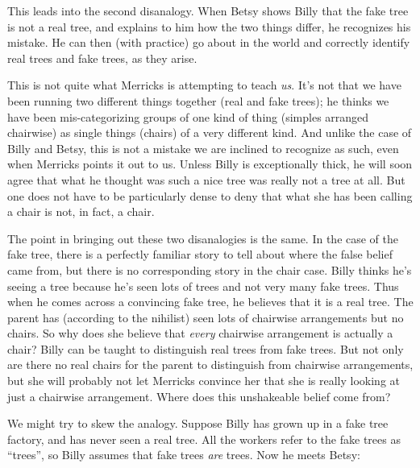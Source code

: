 \documentclass[11pt]{standalone} \newif\ifstandlone \standalonetrue
\begin{document}
\begin{spacing}{1.25}
This leads into the second disanalogy.  When Betsy shows Billy that
the fake tree is not a real tree, and explains to him how the two
things differ, he recognizes his mistake.  He can then (with practice)
go about in the world and correctly identify real trees and fake
trees, as they arise.

This is not quite what Merricks is attempting to teach {\em us}.  It's
not that we have been running two different things together (real and
fake trees); he thinks we have been mis-categorizing groups of one
kind of thing (simples arranged chairwise) as single things (chairs)
of a very different kind.  And unlike the case of Billy and Betsy,
this is not a mistake we are inclined to recognize as such, even when
Merricks points it out to us.  Unless Billy is exceptionally thick, he
will soon agree that what he thought was such a nice tree was really
not a tree at all.  But one does not have to be particularly dense to
deny that what she has been calling a chair is not, in fact, a chair.

The point in bringing out these two disanalogies is the same.  In the
case of the fake tree, there is a perfectly familiar story to tell
about where the false belief came from, but there is no corresponding
story in the chair case.  Billy thinks he's seeing a tree because he's
seen lots of trees and not very many fake trees.  Thus when he comes
across a convincing fake tree, he believes that it is a real tree.
The parent has (according to the nihilist) seen lots of chairwise
arrangements but no chairs.  So why does she believe that {\em every}
chairwise arrangement is actually a chair?  Billy can be taught to
distinguish real trees from fake trees.  But not only are there no
real chairs for the parent to distinguish from chairwise arrangements,
but she will probably not let Merricks convince her that she is really
looking at just a chairwise arrangement.  Where does this unshakeable
belief come from?

We might try to skew the analogy.  Suppose Billy has grown up in a
fake tree factory, and has never seen a real tree.  All the workers
refer to the fake trees as ``trees'', so Billy assumes that fake trees
{\em are} trees.  Now he meets Betsy:






\end{spacing}
\end{document}
